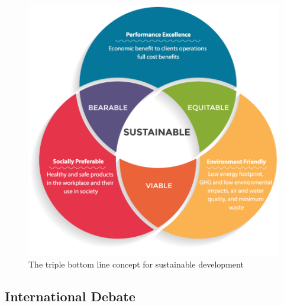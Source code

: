 \documentclass[11pt]{article}
\theoremstyle{definition}
\begin{document}
\begin{figure}[H]
	\centering
	\includegraphics[width=0.5\linewidth]{img/triple_bottom_line.png}
	\caption{The triple bottom line concept for sustainable development}
\end{figure}

\subsection{International Debate}
\end{document}
